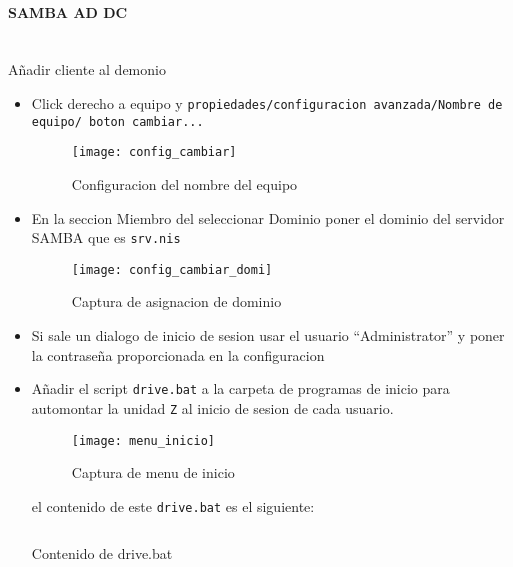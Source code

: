 \documentclass[../main.tex]{subfiles}
\begin{document}
\paragraph{SAMBA AD DC}\ \\Añadir cliente al demonio
\begin{itemize}
  \item Click derecho a equipo y \texttt{propiedades/configuracion avanzada/Nombre de equipo/ boton cambiar...}
        \begin{figure}[H]
          \centering
          \texttt{[image: config\_cambiar]}
          \caption{Configuracion del nombre del equipo}\label{fig:config_cambiar}
        \end{figure}
        \newpage{}

  \item En la seccion Miembro del seleccionar Dominio poner el dominio del servidor SAMBA que es \texttt{srv.nis}
        \begin{figure}[H]
          \centering
          \texttt{[image: config\_cambiar\_domi]}
          \caption{Captura de asignacion de dominio}\label{fig:config_cambiar_domi}
        \end{figure}
        \newpage{}
  \item Si sale un dialogo de inicio de sesion usar el usuario ``Administrator''
        y poner la contraseña proporcionada en la configuracion
  \item Añadir el script \texttt{drive.bat} a la carpeta de programas
        de inicio para automontar la unidad \texttt{Z} al inicio de sesion de
        cada usuario.
        \begin{figure}[H]
          \centering
          \texttt{[image: menu\_inicio]}
          \caption{Captura de menu de inicio}\label{fig:menu_inicio}
        \end{figure}

        el contenido de este \texttt{drive.bat} es el siguiente:


        \begin{listing}[H]
\inputminted{bat}{../configs/drive.bat}
\caption{Contenido de drive.bat}
\label{listing:adduser.sh}
\end{listing}



\end{itemize}
\end{document}
